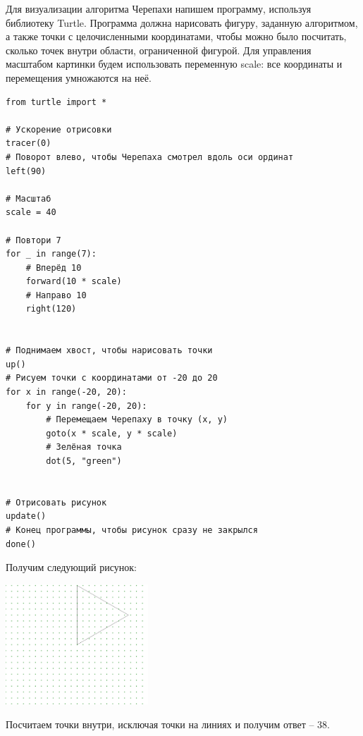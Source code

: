\documentclass[14pt,a4paper]{article}
\begin{document}
Для визуализации алгоритма Черепахи напишем программу, используя
библиотеку Turtle. Программа должна нарисовать фигуру, заданную
алгоритмом, а также точки с целочисленными координатами, чтобы можно
было посчитать, сколько точек внутри области, ограниченной фигурой.
Для управления масштабом картинки будем использовать переменную
scale: все координаты и перемещения умножаются на неё.

\begin{verbatim}
from turtle import *

# Ускорение отрисовки
tracer(0)
# Поворот влево, чтобы Черепаха смотрел вдоль оси ординат
left(90)

# Масштаб
scale = 40

# Повтори 7
for _ in range(7):
    # Вперёд 10
    forward(10 * scale)
    # Направо 10
    right(120)


# Поднимаем хвост, чтобы нарисовать точки
up()
# Рисуем точки с координатами от -20 до 20
for x in range(-20, 20):
    for y in range(-20, 20):
        # Перемещаем Черепаху в точку (x, y)
        goto(x * scale, y * scale)
        # Зелёная точка
        dot(5, "green")


# Отрисовать рисунок
update()
# Конец программы, чтобы рисунок сразу не закрылся
done()
\end{verbatim}

Получим следующий рисунок:
\begin{center}
    \includegraphics[width=0.4\textwidth]{figure.png}
\end{center}

Посчитаем точки внутри, исключая точки на линиях и получим ответ -- 38.
\end{document}
